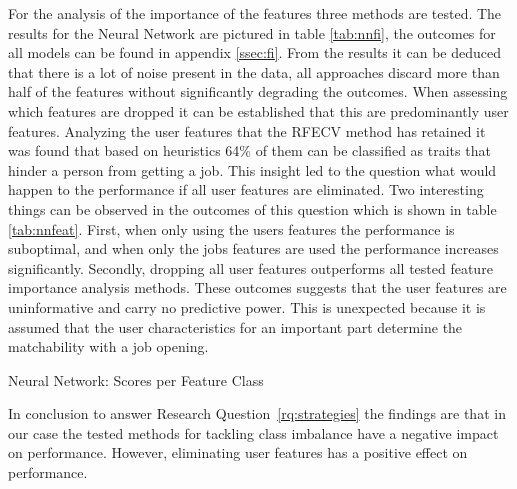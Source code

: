 For the analysis of the importance of the features three methods are tested. 
The results for the Neural Network are pictured in table \ref{tab:nnfi}, the outcomes for all models can be found in appendix \ref{ssec:fi}.
From the results it can be deduced that there is a lot of noise present in the data, all approaches discard more than half of the features without significantly degrading the outcomes.
When assessing which features are dropped it can be established that this are predominantly user features.
Analyzing the user features that the RFECV method has retained it was found that based on heuristics 64\% of them can be classified as traits that hinder a person from getting a job.
This insight led to the question what would happen to the performance if all user features are eliminated.
Two interesting things can be observed in the outcomes of this question which is shown in table \ref{tab:nnfeat}.
First, when only using the users features the performance is suboptimal, and when only the jobs features are used the performance increases significantly.
Secondly, dropping all user features outperforms all tested feature importance analysis methods.
These outcomes suggests that the user features are uninformative and carry no predictive power.
This is unexpected because it is assumed that the user characteristics for an important part determine the matchability with a job opening.

\begin{table}[h]
\begin{footnotesize}

\end{footnotesize}
\caption{\label{tab:nnfeat} \footnotesize{Neural Network: Scores per Feature Class}}
\end{table}

In conclusion to answer Research Question~\ref{rq:strategies} the findings are that in our case the tested methods for tackling class imbalance have a negative impact on performance.
However, eliminating user features has a positive effect on performance.

